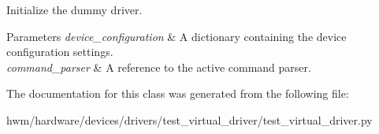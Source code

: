 Initialize the dummy driver. 


\begin{DoxyParams}{Parameters}
{\em device\-\_\-configuration} & A dictionary containing the device configuration settings. \\
\hline
{\em command\-\_\-parser} & A reference to the active command parser. \\
\hline
\end{DoxyParams}


The documentation for this class was generated from the following file\-:\begin{DoxyCompactItemize}
\item 
hwm/hardware/devices/drivers/test\-\_\-virtual\-\_\-driver/test\-\_\-virtual\-\_\-driver.\-py\end{DoxyCompactItemize}
